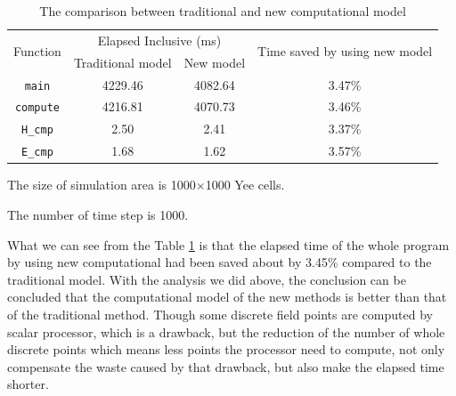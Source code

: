 \begin{table}[hp]
\centering
\caption{The comparison between traditional and new computational model}\label{ch3: tradition or new}
\begin{threeparttable}
	\begin{tabular}{cccc}
		\toprule
		\multirow{2}{3em}{Function}&\multicolumn{2}{c}{Elapsed Inclusive (ms)} & \multirow{2}{11em}{Time saved by using new model}\\ 
		\cline{2-3}
		& Traditional model & New model & \\ 
		
		\midrule
		\lstinline|main| & 4229.46 & 4082.64 & 3.47\% \\ 
		\lstinline|compute| & 4216.81 & 4070.73 & 3.46\%\\ 
		\lstinline|H_cmp|& 2.50 & 2.41 & 3.37\%\\ 
		\lstinline|E_cmp|& 1.68 & 1.62 & 3.57\% \\
		\bottomrule
	\end{tabular}
	\begin{tablenotes}
		\item[1] The size of simulation area is 1000$\times$1000 Yee cells.
		\item[2] The number of time step is 1000.
	\end{tablenotes}
\end{threeparttable}
\end{table}

What we can see from the Table \ref{ch3: tradition or new} is that the elapsed time of the whole program by using new computational had been saved about by 3.45\% compared to the traditional model. With the analysis we did above, the conclusion can be concluded that the computational model of the new methods is better than that of the traditional method. Though some discrete field points are computed by scalar processor, which is a drawback, but the reduction of the number of whole discrete points which means less points the processor need to compute, not only compensate the waste caused by that drawback, but also make the elapsed time shorter.

